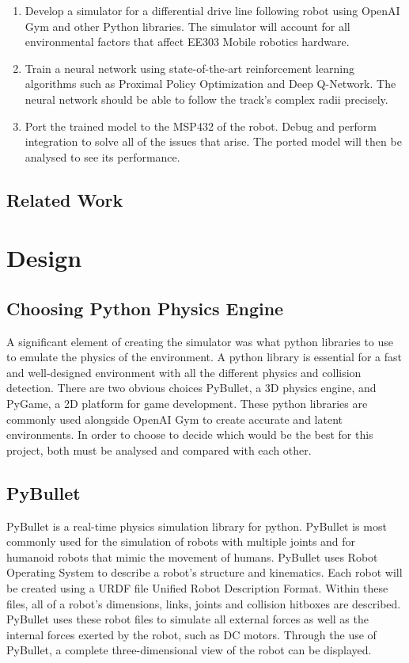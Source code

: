 \documentclass[a4paper,11pt]{article}
\begin{document}
\begin{enumerate}
  \item Develop a simulator for a differential drive line following robot using OpenAI Gym and other Python libraries. The simulator will account for all environmental factors that affect EE303 Mobile robotics hardware. 

  \item Train a neural network using state-of-the-art reinforcement learning algorithms such as Proximal Policy Optimization and Deep Q-Network. The neural network should be able to follow the track's complex radii precisely.
  \item Port the trained model to the MSP432 of the robot. Debug and perform integration to solve all of the issues that arise. The ported model will then be analysed to see its performance.

\end{enumerate}

\subsection{Related Work}

\section{Design}

\subsection{Choosing Python Physics Engine}

A significant element of creating the simulator was what python libraries to use to emulate the physics of the environment. A python library is essential for a fast and well-designed environment with all the different physics and collision detection. There are two obvious choices PyBullet, a 3D physics engine, and PyGame, a 2D platform for game development. These python libraries are commonly used alongside OpenAI Gym to create accurate and latent environments. In order to choose to decide which would be the best for this project, both must be analysed and compared with each other.

\subsection{PyBullet}

PyBullet is a real-time physics simulation library for python. PyBullet is most commonly used for the simulation of robots with multiple joints and for humanoid robots that mimic the movement of humans. PyBullet uses Robot Operating System to describe a robot's structure and kinematics. Each robot will be created using a URDF file Unified Robot Description Format. Within these files, all of a robot's dimensions, links, joints and collision hitboxes are described. PyBullet uses these robot files to simulate all external forces as well as the internal forces exerted by the robot, such as DC motors. Through the use of PyBullet, a complete three-dimensional view of the robot can be displayed.
\end{document}
